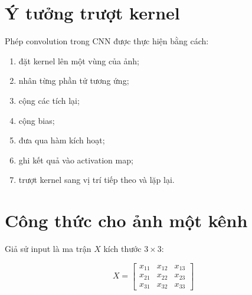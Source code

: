 \documentclass[12pt,a4paper]{report}
\begin{document}
\section{Ý tưởng trượt kernel}

Phép convolution trong CNN được thực hiện bằng cách:

\begin{enumerate}
    \item đặt kernel lên một vùng của ảnh;
    \item nhân từng phần tử tương ứng;
    \item cộng các tích lại;
    \item cộng bias;
    \item đưa qua hàm kích hoạt;
    \item ghi kết quả vào activation map;
    \item trượt kernel sang vị trí tiếp theo và lặp lại.
\end{enumerate}

\begin{center}
\end{center}

\section{Công thức cho ảnh một kênh}

Giả sử input là ma trận $X$ kích thước $3\times3$:

\[
    X =
    \begin{bmatrix}
    x_{11} & x_{12} & x_{13}\\
    x_{21} & x_{22} & x_{23}\\
    x_{31} & x_{32} & x_{33}
    \end{bmatrix}
\]
\end{document}
